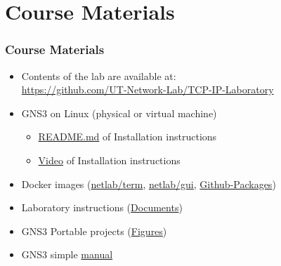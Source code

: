 \documentclass[aspectratio=169,15pt]{beamer}
\begin{document}
\section{Course Materials}
\begin{frame}
    \frametitle{Course Materials}

    \begin{itemize}
        \item Contents of the lab are available at:\\
         \url{https://github.com/UT-Network-Lab/TCP-IP-Laboratory}
        \item GNS3 on Linux (physical or virtual machine)
        \begin{itemize}
            \item \href{https://github.com/UT-Network-Lab/TCP-IP-Laboratory/blob/master/README.md}{README.md} of Installation instructions
            \item \href{https://www.dropbox.com/s/bad8eongryfnylr/GNS3\%20Installation\%20Tutorial.mp4?dl=0}{Video} of Installation instructions
        \end{itemize}
        \item Docker images (\href{https://hub.docker.com/r/utnetlab/term}{netlab/term}, \href{https://hub.docker.com/r/utnetlab/gui}{netlab/gui}, \href{https://github.com/orgs/UT-Network-Lab/packages?repo_name=docker-tools}{Github-Packages})
        \item Laboratory instructions (\href{https://github.com/UT-Network-Lab/TCP-IP-Laboratory/releases/latest}{Documents})
        \item GNS3 Portable projects (\href{https://github.com/UT-Network-Lab/gns3-figures/releases/latest}{Figures})
        \item GNS3 simple \href{https://github.com/UT-Network-Lab/TCP-IP-Laboratory/blob/master/gns3.md}{manual}
    \end{itemize}

\end{frame}
\end{document}
